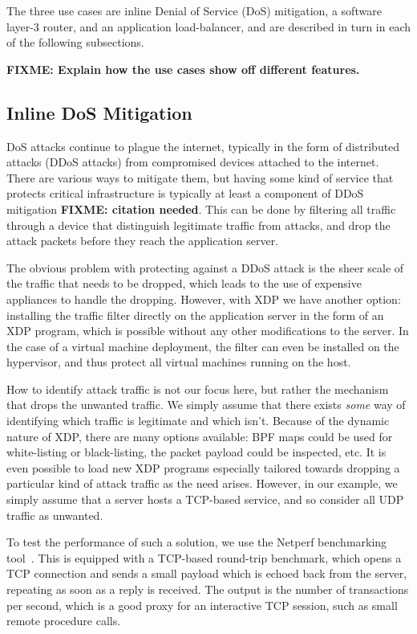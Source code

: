 \documentclass[10pt,sigconf]{acmart}
\begin{document}
The three use cases are inline Denial of Service (DoS) mitigation, a software
layer-3 router, and an application load-balancer, and are described in turn in
each of the following subsections.

\textbf{FIXME: Explain how the use cases show off different features.}

\subsection{Inline DoS Mitigation}
\label{sec:dos-usecase}
DoS attacks continue to plague the internet, typically in the form of
distributed attacks (DDoS attacks) from compromised devices attached to the
internet. There are various ways to mitigate them, but having some kind of
service that protects critical infrastructure is typically at least a component
of DDoS mitigation \textbf{FIXME: citation needed}. This can be done by
filtering all traffic through a device that distinguish legitimate traffic from
attacks, and drop the attack packets before they reach the application server.

The obvious problem with protecting against a DDoS attack is the sheer scale of
the traffic that needs to be dropped, which leads to the use of expensive
appliances to handle the dropping. However, with XDP we have another option:
installing the traffic filter directly on the application server in the form of
an XDP program, which is possible without any other modifications to the server.
In the case of a virtual machine deployment, the filter can even be installed on
the hypervisor, and thus protect all virtual machines running on the host.

How to identify attack traffic is not our focus here, but rather the mechanism
that drops the unwanted traffic. We simply assume that there exists \emph{some}
way of identifying which traffic is legitimate and which isn't. Because of the
dynamic nature of XDP, there are many options available: BPF maps could be used
for white-listing or black-listing, the packet payload could be inspected, etc.
It is even possible to load new XDP programs especially tailored towards
dropping a particular kind of attack traffic as the need arises. However, in our
example, we simply assume that a server hosts a TCP-based service, and so
consider all UDP traffic as unwanted.

To test the performance of such a solution, we use the Netperf benchmarking
tool~\cite{netperf}. This is equipped with a TCP-based round-trip benchmark,
which opens a TCP connection and sends a small payload which is echoed back from
the server, repeating as soon as a reply is received. The output is the number
of transactions per second, which is a good proxy for an interactive TCP
session, such as small remote procedure calls.
\end{document}
